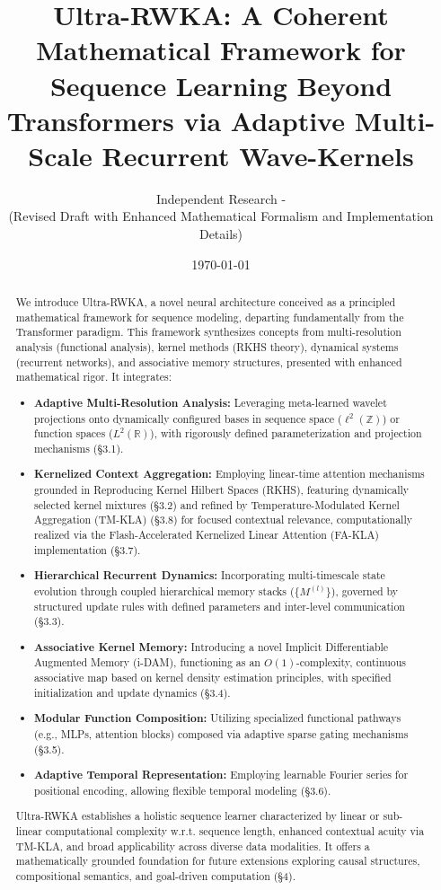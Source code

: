 \documentclass{article}
\title{Ultra-RWKA: A Coherent Mathematical Framework for Sequence Learning Beyond Transformers via Adaptive Multi-Scale Recurrent Wave-Kernels}
\author{Independent Research - \@Quantvmh \\ (Revised Draft with Enhanced Mathematical Formalism and Implementation Details)}
\date{\today} %
\begin{document}
\maketitle

\begin{abstract}
We introduce Ultra-RWKA, a novel neural architecture conceived as a principled mathematical framework for sequence modeling, departing fundamentally from the Transformer paradigm. This framework synthesizes concepts from multi-resolution analysis (functional analysis), kernel methods (RKHS theory), dynamical systems (recurrent networks), and associative memory structures, presented with enhanced mathematical rigor. It integrates:
\begin{itemize}
    \item \textbf{Adaptive Multi-Resolution Analysis:} Leveraging meta-learned wavelet projections onto dynamically configured bases in sequence space ($\ell^2(\mathbb{Z})$) or function spaces ($L^2(\mathbb{R})$), with rigorously defined parameterization and projection mechanisms (\S3.1).
    \item \textbf{Kernelized Context Aggregation:} Employing linear-time attention mechanisms grounded in Reproducing Kernel Hilbert Spaces (RKHS), featuring dynamically selected kernel mixtures (\S3.2) and refined by Temperature-Modulated Kernel Aggregation (TM-KLA) (\S3.8) for focused contextual relevance, computationally realized via the Flash-Accelerated Kernelized Linear Attention (FA-KLA) implementation (\S3.7).
    \item \textbf{Hierarchical Recurrent Dynamics:} Incorporating multi-timescale state evolution through coupled hierarchical memory stacks ($\{M^{(l)}\}$), governed by structured update rules with defined parameters and inter-level communication (\S3.3).
    \item \textbf{Associative Kernel Memory:} Introducing a novel Implicit Differentiable Augmented Memory (i-DAM), functioning as an $O(1)$-complexity, continuous associative map based on kernel density estimation principles, with specified initialization and update dynamics (\S3.4).
    \item \textbf{Modular Function Composition:} Utilizing specialized functional pathways (e.g., MLPs, attention blocks) composed via adaptive sparse gating mechanisms (\S3.5).
    \item \textbf{Adaptive Temporal Representation:} Employing learnable Fourier series for positional encoding, allowing flexible temporal modeling (\S3.6).
\end{itemize}
Ultra-RWKA establishes a holistic sequence learner characterized by linear or sub-linear computational complexity w.r.t. sequence length, enhanced contextual acuity via TM-KLA, and broad applicability across diverse data modalities. It offers a mathematically grounded foundation for future extensions exploring causal structures, compositional semantics, and goal-driven computation (\S4).
\end{abstract}
\end{document}

